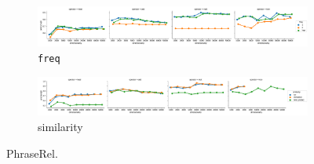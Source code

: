 \begin{figure}[b]
  \centering

  \begin{subfigure}[t]{\textwidth}
    \includegraphics[width=1.1\textwidth]{supplement/figures/phraserel-interaction-freq}

  \caption{\texttt{freq}}
  \label{fig:phraserel-freq}
  \end{subfigure}

  \begin{subfigure}[t]{\textwidth}
    \includegraphics[width=1.1\textwidth]{supplement/figures/phraserel-interaction-similarity}

  \caption{similarity}
  \label{fig:phraserel-similarity}
  \end{subfigure}

  \caption{PhraseRel.}
\end{figure}
